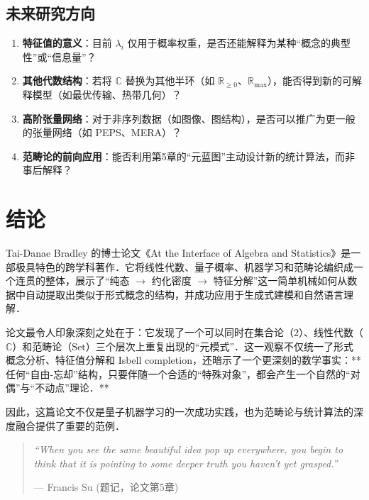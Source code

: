 \documentclass[10pt, openany]{book}
\begin{document}
\subsection{未来研究方向}

\begin{enumerate}
    \item \textbf{特征值的意义}：目前 $\lambda_i$ 仅用于概率权重，是否还能解释为某种“概念的典型性”或“信息量”？
    \item \textbf{其他代数结构}：若将 $\mathbb{C}$ 替换为其他半环（如 $\mathbb{R}_{\ge 0}$、$\mathbb{R}_{\max}$），能否得到新的可解释模型（如最优传输、热带几何）？
    \item \textbf{高阶张量网络}：对于非序列数据（如图像、图结构），是否可以推广为更一般的张量网络（如 PEPS、MERA）？
    \item \textbf{范畴论的前向应用}：能否利用第5章的“元蓝图”主动设计新的统计算法，而非事后解释？
\end{enumerate}

\section{结论}

Tai-Danae Bradley 的博士论文《At the Interface of Algebra and Statistics》是一部极具特色的跨学科著作．它将线性代数、量子概率、机器学习和范畴论编织成一个连贯的整体，展示了“纯态 $\to$ 约化密度 $\to$ 特征分解”这一简单机械如何从数据中自动提取出类似于形式概念的结构，并成功应用于生成式建模和自然语言理解．

论文最令人印象深刻之处在于：它发现了一个可以同时在集合论（$2$）、线性代数（$\mathbb{C}$）和范畴论（$\mathrm{Set}$）三个层次上重复出现的“元模式”．这一观察不仅统一了形式概念分析、特征值分解和 Isbell completion，还暗示了一个更深刻的数学事实：**任何“自由-忘却”结构，只要伴随一个合适的“特殊对象”，都会产生一个自然的“对偶”与“不动点”理论．**

因此，这篇论文不仅是量子机器学习的一次成功实践，也为范畴论与统计算法的深度融合提供了重要的范例．

\begin{quote}
    \textit{“When you see the same beautiful idea pop up everywhere, you begin to think that it is pointing to some deeper truth you haven't yet grasped.”}
    
    \hfill --- Francis Su (题记，论文第5章)
\end{quote}





\end{document}
